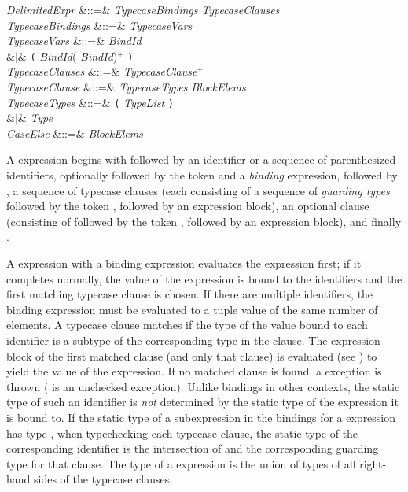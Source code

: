 \begin{Grammar}
\emph{DelimitedExpr}
&::=&  \emph{TypecaseBindings} 
\emph{TypecaseClauses}  \\

\emph{TypecaseBindings} &::=& \emph{TypecaseVars}
\\

\emph{TypecaseVars} &::=& \emph{BindId} \\
&$|$& \texttt{(} \emph{BindId}(\EXP{,} \emph{BindId})$^+$ \texttt{)} \\

\emph{TypecaseClauses} &::=& \emph{TypecaseClause}$^+$\\

\emph{TypecaseClause} &::=&
\emph{TypecaseTypes} \EXP{\Rightarrow} \emph{BlockElems} \\

\emph{TypecaseTypes}
&::=& \texttt{(} \emph{TypeList} \texttt{)}\\
&$|$& \emph{Type} \\

\emph{CaseElse} &::=&  \EXP{\Rightarrow} \emph{BlockElems}\\

\end{Grammar}

A  expression begins with  followed by
an identifier or a sequence of parenthesized identifiers,
optionally followed by the token \EXP{=} and a \emph{binding} expression,
followed by , a sequence of typecase clauses
(each consisting of a sequence of \emph{guarding types}
followed by the token \EXP{\Rightarrow}, followed by an expression block),
an optional  clause
(consisting of  followed by the token \EXP{\Rightarrow},
followed by an expression block),
and finally .

A  expression with a binding expression
evaluates the expression first;
if it completes normally, the value of the expression is bound
to the identifiers and the first matching typecase clause is chosen.
If there are multiple identifiers, the binding expression must be evaluated
to a tuple value of the same number of elements.
A typecase clause matches if the type of the value bound to each identifier
is a subtype of the corresponding type in the clause.
The expression block of the first matched clause
(and only that clause) is evaluated (see ) to yield
the value of the  expression.
If no matched clause is found, a  exception is thrown
( is an unchecked exception).
Unlike bindings in other contexts,
the static type of such an identifier
is \emph{not} determined by the static type of
the expression it is bound to.
If the static type of a subexpression
in the bindings for a  expression has type ,
when typechecking each typecase clause,
the static type of the corresponding identifier is the intersection of 
and the corresponding guarding type for that clause.
The type of a  expression is the union
of types of all right-hand sides of the typecase clauses.


